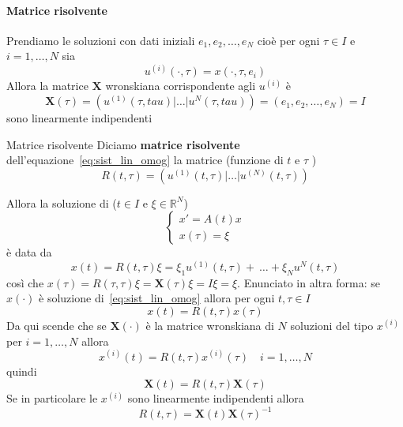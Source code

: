 \paragraph{Matrice risolvente} Prendiamo le soluzioni con dati iniziali \(e_{1},
e_{2}, \dots, e_N\) cioè per ogni \(\tau \in I\) e \(i = 1, \dots, N\) sia 
\[
  u^{{(i)}}{(\cdot, \tau)} = x{(\cdot , \tau, e_{i})}
\]
Allora la matrice \(\mathbf{X} \) wronskiana corrispondente agli \(u^{{(i)}}\) è
\[
  \mathbf{X} {(\tau)} = {\left( u^{{(1)}}{(\tau, tau)} | \dots | u^{N}{(\tau,
  tau)}\right)} = {\left( e_{1}, e_{2}, \dots, e_N \right)} = I
\]
sono linearmente indipendenti
\begin{definition}{Matrice risolvente}
    Diciamo \textbf{matrice risolvente} dell'equazione~\eqref{eq:sist_lin_omog}
    la matrice (funzione di \(t\) e \(\tau\) )
    \[
      R{(t, \tau)} = {\left( u^{{(1)}}{(t, \tau)} | \dots | u^{{(N)}}{(t, \tau)} \right)} 
    \]
\end{definition}
Allora la soluzione di (\(t \in I\) e \(\xi \in \mathbb{R}^{N}\))
\[
  \begin{cases}
      x' = A{(t)}x \\
      x{(\tau)} = \xi
  \end{cases}
\]
è data da
\[
    x{(t)} = R{(t, \tau)} \xi = \xi_{1} u^{{(1)}}{(t, \tau)} +~\dots + \xi_{N}
    u^{N}{( t, \tau)}
\]
così che \(x{(\tau)} = R{(\tau, \tau)}\xi = \mathbf{X} {(\tau)} \xi= I\xi =
\xi\). Enunciato in altra forma: se \(x{(\cdot )}\) è soluzione
di~\eqref{eq:sist_lin_omog} allora per ogni \(t, \tau \in I\) 
\[
    x{(t)} = R{(t, \tau)} x{(\tau)}
\]
Da qui scende che se \(\mathbf{X}{(\cdot )}\) è la matrice wronskiana di \(N\)
soluzioni del tipo \(x^{{(i)}}\) per \(i = 1, \dots, N\) allora
\[
    x^{{(i)}}{(t)} = R{(t, \tau)} x^{{(i)}}{(\tau)} \quad i = 1, \dots, N
\]
quindi
\[
    \mathbf{X} {(t)} = R{(t, \tau)} \mathbf{X} {(\tau)}
\]
Se in particolare le \(x^{{(i)}}\) sono linearmente indipendenti allora
\[
    R{(t, \tau)} = \mathbf{X} {(t)} \mathbf{X} {(\tau)}^{-1}
\]
\addtocounter{excounter}{-1}
